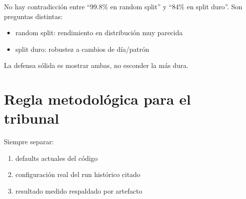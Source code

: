 ﻿\documentclass[12pt,a4paper]{article}
\begin{document}
No hay contradicción entre ``99.8\% en random split'' y ``84\% en split duro''. Son preguntas
distintas:

\begin{itemize}
  \item random split: rendimiento en distribución muy parecida
  \item split duro: robustez a cambios de día/patrón
\end{itemize}

La defensa sólida es mostrar ambas, no esconder la más dura.

\section{Regla metodológica para el tribunal}

Siempre separar:

\begin{enumerate}
  \item defaults actuales del código
  \item configuración real del run histórico citado
  \item resultado medido respaldado por artefacto
\end{enumerate}
\end{document}
